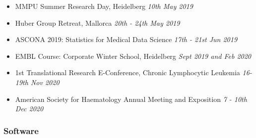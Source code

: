 \documentclass[11pt, a4paper, twosided]{book}
\begin{document}
\begin{itemize}
      \item MMPU Summer Research Day, Heidelberg \textit{10th May 2019}
      \item Huber Group Retreat, Mallorca \textit{20th - 24th May 2019}
      \item ASCONA 2019: Statistics for Medical Data Science \textit{17th - 21st Jun 2019}
      \item EMBL Course: Corporate Winter School, Heidelberg \textit{Sept 2019 and Feb 2020}
      \item 1st Translational Research E-Conference, Chronic Lymphocytic Leukemia
    \textit{16-19th Nov 2020}
      \item American Society for Haematology Annual Meeting and Exposition \textit{7 - 10th Dec 2020}

    \end{itemize}
    \hypertarget{software}{%
    \subsubsection*{Software}\label{software}}
\end{document}
